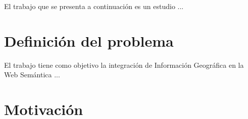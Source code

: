 El trabajo que se presenta a continuación es un estudio ...





\section{Definición del problema}




El trabajo tiene como objetivo la integración de Información Geográfica en la Web Semántica ...



\section{Motivación}


